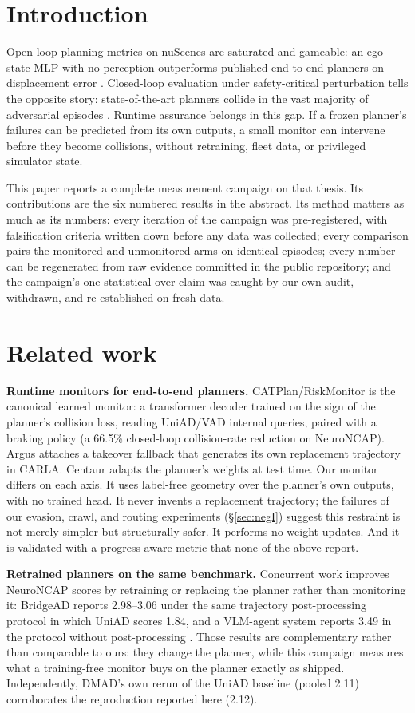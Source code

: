 \documentclass[11pt]{article}
\begin{document}
\section{Introduction}
Open-loop planning metrics on nuScenes are saturated and gameable: an ego-state MLP with no
perception outperforms published end-to-end planners on displacement error
\cite{bevplanner}. Closed-loop evaluation under safety-critical perturbation tells the
opposite story: state-of-the-art planners collide in the vast majority of adversarial episodes
\cite{neuroncap}. Runtime assurance belongs in this gap. If a frozen planner's failures can be
predicted from its own outputs, a small monitor can intervene before they become collisions,
without retraining, fleet data, or privileged simulator state.

This paper reports a complete measurement campaign on that thesis. Its contributions are the
six numbered results in the abstract. Its method matters as much as its numbers: every
iteration of the campaign was pre-registered, with falsification criteria written down before
any data was collected; every comparison pairs the monitored and unmonitored arms on identical
episodes; every number can be regenerated from raw evidence committed in the public
repository; and the campaign's one statistical over-claim was caught by our own audit,
withdrawn, and re-established on fresh data.

\section{Related work}
\textbf{Runtime monitors for end-to-end planners.} CATPlan/RiskMonitor \cite{catplan} is the
canonical learned monitor: a transformer decoder trained on the sign of the planner's
collision loss, reading UniAD/VAD internal queries, paired with a braking policy (a 66.5\%
closed-loop collision-rate reduction on NeuroNCAP). Argus \cite{argus} attaches a takeover
fallback that generates its own replacement trajectory in CARLA. Centaur \cite{centaur}
adapts the planner's weights at test time. Our monitor differs on each axis. It uses
label-free geometry over the planner's own outputs, with no trained head. It never invents a
replacement trajectory; the failures of our evasion, crawl, and routing experiments
(\S\ref{sec:negI}) suggest this restraint is not merely simpler but structurally safer. It
performs no weight updates. And it is validated with a progress-aware metric that none of the
above report.

\textbf{Retrained planners on the same benchmark.} Concurrent work improves NeuroNCAP scores
by retraining or replacing the planner rather than monitoring it: BridgeAD \cite{bridgead}
reports 2.98--3.06 under the same trajectory post-processing protocol in which UniAD scores
1.84, and a VLM-agent system reports 3.49 in the protocol without post-processing
\cite{imagidrive}. Those results are complementary rather than comparable to ours: they change
the planner, while this campaign measures what a training-free monitor buys on the planner
exactly as shipped. Independently, DMAD's own rerun of the UniAD baseline (pooled 2.11)
\cite{dmad} corroborates the reproduction reported here (2.12).
\end{document}
